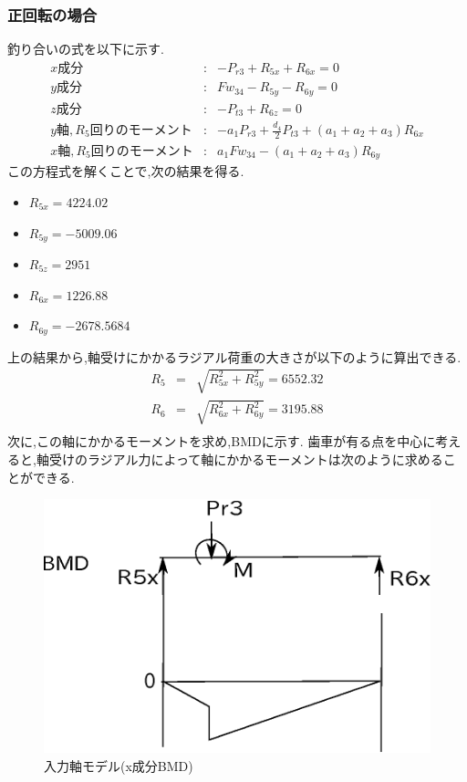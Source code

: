 \subsubsection{正回転の場合}
釣り合いの式を以下に示す.
\begin{eqnarray}
x成分&:&-P_{r3}+R_{5x}+R_{6x}=0\\
y成分&:&Fw_{34}-R_{5y}-R_{6y}=0\\
z成分&:&-P_{t3}+R_{6z}=0\\
y軸,R_5回りのモーメント&:&-a_1P_{r3}+\frac{d_4}{2}P_{t3}+(a_1+a_2+a_3)R_{6x}\\
x軸,R_5回りのモーメント&:&a_1Fw_{34}-(a_1+a_2+a_3)R_{6y}
\end{eqnarray}
この方程式を解くことで,次の結果を得る.
\begin{itemize}
\item $R_{5x} = 4224.02$
\item $R_{5y} = -5009.06$
\item $R_{5z} = 2951$
\item $R_{6x} = 1226.88$
\item $R_{6y} = -2678.5684$
\end{itemize}
上の結果から,軸受けにかかるラジアル荷重の大きさが以下のように算出できる.
\begin{eqnarray}
R_5 &=& \sqrt {R_{5x}^2+R_{5y}^2} = 6552.32\\
R_6 &=& \sqrt {R_{6x}^2+R_{6y}^2} = 3195.88\\
\end{eqnarray}
次に,この軸にかかるモーメントを求め,BMDに示す.
歯車が有る点を中心に考えると,軸受けのラジアル力によって軸にかかるモーメントは次のように求めることができる.
\begin{figure}[htbp]
\begin{center}
\includegraphics[width=12cm]{../picture/jiku34.eps}
\end{center}
\caption{入力軸モデル(x成分BMD)}
\end{figure}
